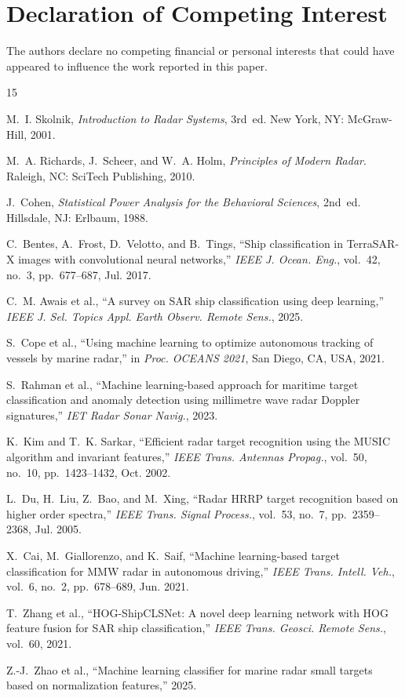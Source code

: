 \documentclass[journal]{IEEEtran}
\begin{document}
\section*{Declaration of Competing Interest}
The authors declare no competing financial or personal interests that could have appeared to influence the work reported in this paper.


\begin{thebibliography}{15}

M.~I. Skolnik, \textit{Introduction to Radar Systems}, 3rd~ed. New York, NY: McGraw-Hill, 2001.

M.~A. Richards, J.~Scheer, and W.~A. Holm, \textit{Principles of Modern Radar}. Raleigh, NC: SciTech Publishing, 2010.

J.~Cohen, \textit{Statistical Power Analysis for the Behavioral Sciences}, 2nd~ed. Hillsdale, NJ: Erlbaum, 1988.

C.~Bentes, A.~Frost, D.~Velotto, and B.~Tings, ``Ship classification in TerraSAR-X images with convolutional neural networks,'' \textit{IEEE J. Ocean. Eng.}, vol.~42, no.~3, pp.~677--687, Jul. 2017.

C.~M. Awais et al., ``A survey on SAR ship classification using deep learning,'' \textit{IEEE J. Sel. Topics Appl. Earth Observ. Remote Sens.}, 2025.

S.~Cope et al., ``Using machine learning to optimize autonomous tracking of vessels by marine radar,'' in \textit{Proc. OCEANS 2021}, San Diego, CA, USA, 2021.

S.~Rahman et al., ``Machine learning-based approach for maritime target classification and anomaly detection using millimetre wave radar Doppler signatures,'' \textit{IET Radar Sonar Navig.}, 2023.

K.~Kim and T.~K. Sarkar, ``Efficient radar target recognition using the MUSIC algorithm and invariant features,'' \textit{IEEE Trans. Antennas Propag.}, vol.~50, no.~10, pp.~1423--1432, Oct. 2002.

L.~Du, H.~Liu, Z.~Bao, and M.~Xing, ``Radar HRRP target recognition based on higher order spectra,'' \textit{IEEE Trans. Signal Process.}, vol.~53, no.~7, pp.~2359--2368, Jul. 2005.

X.~Cai, M.~Giallorenzo, and K.~Saif, ``Machine learning-based target classification for MMW radar in autonomous driving,'' \textit{IEEE Trans. Intell. Veh.}, vol.~6, no.~2, pp.~678--689, Jun. 2021.

T.~Zhang et al., ``HOG-ShipCLSNet: A novel deep learning network with HOG feature fusion for SAR ship classification,'' \textit{IEEE Trans. Geosci. Remote Sens.}, vol.~60, 2021.

Z.-J.~Zhao et al., ``Machine learning classifier for marine radar small targets based on normalization features,'' 2025.

\end{thebibliography}
\end{document}
